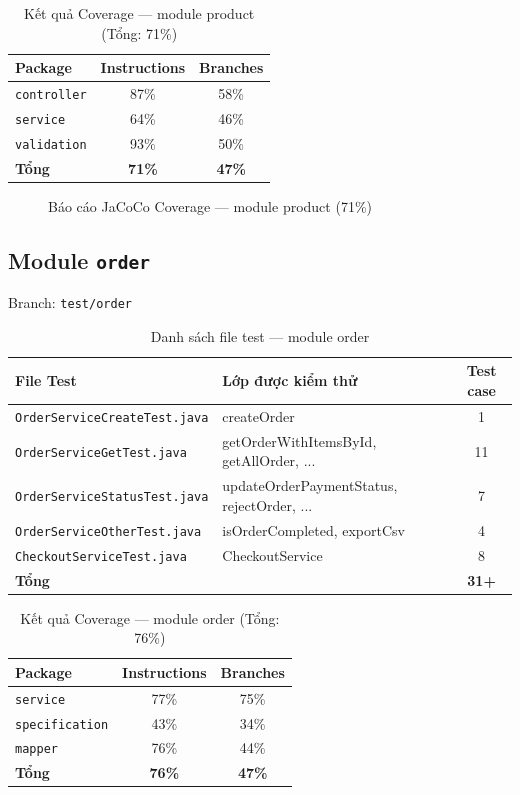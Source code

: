 \begin{table}[H]
\centering
\caption{Kết quả Coverage --- module product (Tổng: 71\%)}
\begin{tabular}{|l|c|c|}
\hline
\textbf{Package} & \textbf{Instructions} & \textbf{Branches} \\
\hline
\texttt{controller} & 87\% & 58\% \\
\hline
\texttt{service} & 64\% & 46\% \\
\hline
\texttt{validation} & 93\% & 50\% \\
\hline
\textbf{Tổng} & \textbf{71\%} & \textbf{47\%} \\
\hline
\end{tabular}
\end{table}

\begin{figure}[H]
\centering
{}
\caption{Báo cáo JaCoCo Coverage --- module product (71\%)}
\end{figure}

\subsection{Module \texttt{order}}

Branch: \texttt{test/order}

\begin{table}[H]
\centering
\caption{Danh sách file test --- module order}
\begin{tabular}{|l|l|c|}
\hline
\textbf{File Test} & \textbf{Lớp được kiểm thử} & \textbf{Test case} \\
\hline
\texttt{OrderServiceCreateTest.java} & createOrder & 1 \\
\hline
\texttt{OrderServiceGetTest.java} & getOrderWithItemsById, getAllOrder, ... & 11 \\
\hline
\texttt{OrderServiceStatusTest.java} & updateOrderPaymentStatus, rejectOrder, ... & 7 \\
\hline
\texttt{OrderServiceOtherTest.java} & isOrderCompleted, exportCsv & 4 \\
\hline
\texttt{CheckoutServiceTest.java} & CheckoutService & 8 \\
\hline
\textbf{Tổng} & & \textbf{31+} \\
\hline
\end{tabular}
\end{table}

\begin{table}[H]
\centering
\caption{Kết quả Coverage --- module order (Tổng: 76\%)}
\begin{tabular}{|l|c|c|}
\hline
\textbf{Package} & \textbf{Instructions} & \textbf{Branches} \\
\hline
\texttt{service} & 77\% & 75\% \\
\hline
\texttt{specification} & 43\% & 34\% \\
\hline
\texttt{mapper} & 76\% & 44\% \\
\hline
\textbf{Tổng} & \textbf{76\%} & \textbf{47\%} \\
\hline
\end{tabular}
\end{table}

